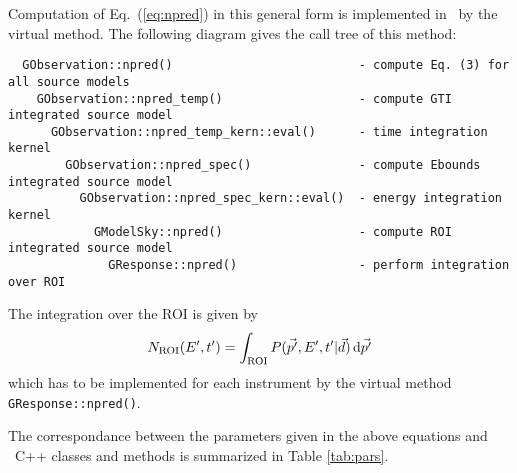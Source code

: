 \documentclass{article}[12pt,a4]
\begin{document}
Computation of Eq.~(\ref{eq:npred}) in this general form is implemented in \this\ by the 
virtual method.
The following diagram gives the call tree of this method:
\begin{verbatim}
  GObservation::npred()                          - compute Eq. (3) for all source models
    GObservation::npred_temp()                   - compute GTI integrated source model
      GObservation::npred_temp_kern::eval()      - time integration kernel
        GObservation::npred_spec()               - compute Ebounds integrated source model
          GObservation::npred_spec_kern::eval()  - energy integration kernel
            GModelSky::npred()                   - compute ROI integrated source model
              GResponse::npred()                 - perform integration over ROI
\end{verbatim}
The integration over the ROI is given by
\begin{equation}
N_{\rm ROI}(E', t') = \int_{\rm ROI} P(\vec{p'}, E', t' | \vec{d}) \, {\rm d}\vec{p'}
\label{eq:nroi}
\end{equation}
which has to be implemented for each instrument by the virtual method
{\tt GResponse::npred()}.

The correspondance between the parameters given in the above equations and
\this\ C++ classes and methods is summarized in Table \ref{tab:pars}.
\end{document}
